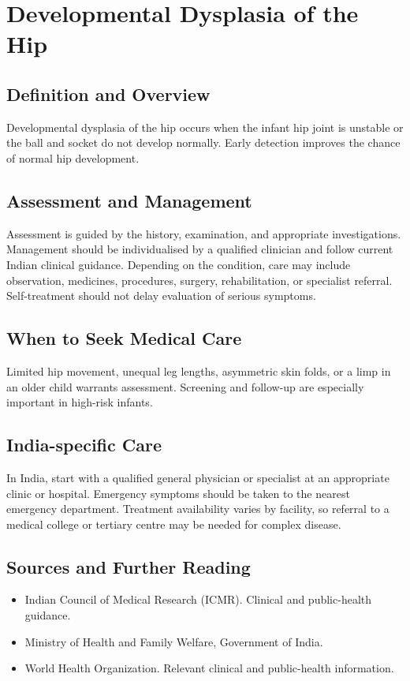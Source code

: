 \chapter{Developmental Dysplasia of the Hip}

\section*{Definition and Overview}
Developmental dysplasia of the hip occurs when the infant hip joint is unstable or the ball and socket do not develop normally. Early detection improves the chance of normal hip development.

\section*{Assessment and Management}
Assessment is guided by the history, examination, and appropriate investigations. Management should be individualised by a qualified clinician and follow current Indian clinical guidance. Depending on the condition, care may include observation, medicines, procedures, surgery, rehabilitation, or specialist referral. Self-treatment should not delay evaluation of serious symptoms.

\section*{When to Seek Medical Care}
Limited hip movement, unequal leg lengths, asymmetric skin folds, or a limp in an older child warrants assessment. Screening and follow-up are especially important in high-risk infants.

\section*{India-specific Care}
In India, start with a qualified general physician or specialist at an appropriate clinic or hospital. Emergency symptoms should be taken to the nearest emergency department. Treatment availability varies by facility, so referral to a medical college or tertiary centre may be needed for complex disease.

\section*{Sources and Further Reading}
\begin{itemize}
    \item Indian Council of Medical Research (ICMR). Clinical and public-health guidance.
    \item Ministry of Health and Family Welfare, Government of India.
    \item World Health Organization. Relevant clinical and public-health information.
\end{itemize}

